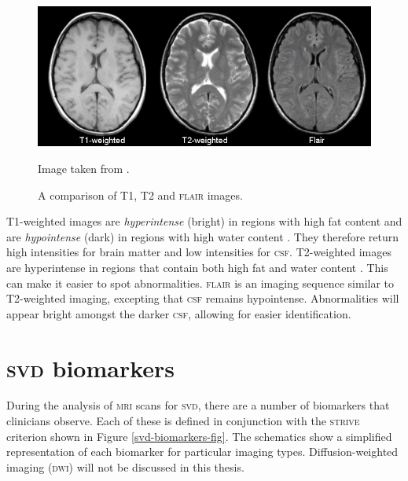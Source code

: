 \begin{figure}[ht]
	\centering
	\includegraphics[width=\textwidth]{Images/2_t1_t2_flair.jpg}
	\caption{A comparison of T1, T2 and \textsc{flair} images.}
	\small Image taken from \cite{Preston2006}.
	\label{svd-t1-vs-t2}
\end{figure}

T1-weighted images are \textit{hyperintense} (bright) in regions with high fat content and are \textit{hypointense} (dark) in regions with high water content \cite{Bitar2006}. They therefore return high intensities for brain matter and low intensities for \textsc{csf}. T2-weighted images are hyperintense in regions that contain both high fat and water content \cite{Bitar2006}. This can make it easier to spot abnormalities. \textsc{flair} is an imaging sequence similar to T2-weighted imaging, excepting that \textsc{csf} remains hypointense. Abnormalities will appear bright amongst the darker \textsc{csf}, allowing for easier identification.

\section{\textsc{svd} biomarkers}\label{svd-markers}

During the analysis of \textsc{mri} scans for \textsc{svd}, there are a number of biomarkers that clinicians observe. Each of these is defined in conjunction with the \textsc{strive} criterion \cite{WardlawJ.M.2013Nsfr} shown in Figure \ref{svd-biomarkers-fig}. The schematics show a simplified representation of each biomarker for particular imaging types. Diffusion-weighted imaging (\textsc{dwi}) will not be discussed in this thesis. 

